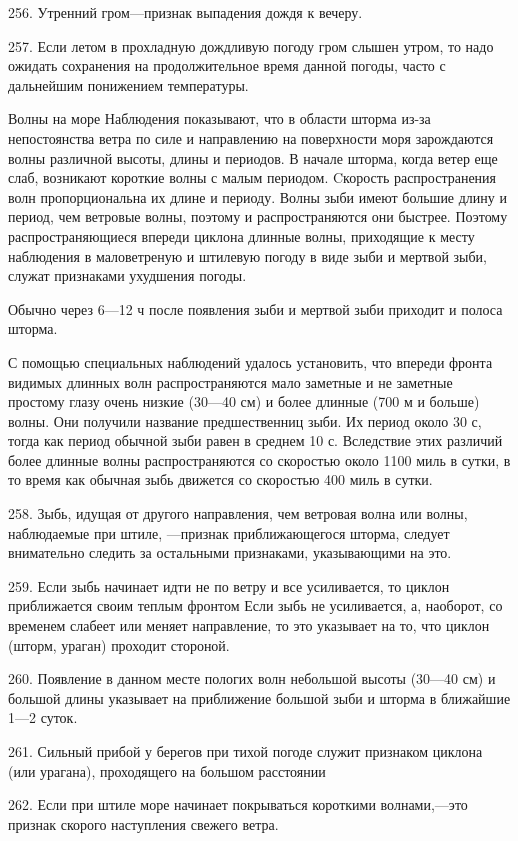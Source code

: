 256. Утренний гром—признак выпадения дождя к вечеру.

257. Если летом в прохладную дождливую погоду гром слышен утром, то надо ожидать сохранения на продолжительное время данной погоды, часто с дальнейшим понижением температуры.

Волны на море
Наблюдения показывают, что в области шторма из-за непостоянства ветра по силе и направлению на поверхности моря зарождаются волны различной высоты, длины и периодов. В начале шторма, когда ветер еще слаб, возникают короткие волны с малым периодом. Cкорость распространения волн пропорциональна их длине и периоду. Волны зыби имеют большие длину и период, чем ветровые волны, поэтому и распространяются они быстрее. Поэтому распространяющиеся впереди циклона длинные волны, приходящие к месту наблюдения в маловетреную и штилевую погоду в виде зыби и мертвой зыби, служат признаками ухудшения погоды.

Обычно через 6—12 ч после появления зыби и мертвой зыби приходит и полоса шторма.

С помощью специальных наблюдений удалось установить, что впереди фронта видимых длинных волн распространяются мало заметные и не заметные простому глазу очень низкие (30—40 см) и более длинные (700 м и больше) волны. Они получили название предшественниц зыби. Их период около 30 с, тогда как период обычной зыби равен в среднем 10 с. Вследствие этих различий более длинные волны распространяются со скоростью около 1100 миль в сутки, в то время как обычная зыбь движется со скоростью 400 миль в сутки.

258. Зыбь, идущая от другого направления, чем ветровая волна или волны, наблюдаемые при штиле, —признак приближающегося шторма, следует внимательно следить за остальными признаками, указывающими на это.

259. Если зыбь начинает идти не по ветру и все усиливается, то циклон приближается своим теплым фронтом Если зыбь не усиливается, а, наоборот, со временем слабеет или меняет направление, то это указывает на то, что циклон (шторм, ураган) проходит стороной.

260. Появление в данном месте пологих волн небольшой высоты (30—40 см) и большой длины указывает на приближение большой зыби и шторма в ближайшие 1—2 суток.

261. Сильный прибой у берегов при тихой погоде служит признаком циклона (или урагана), проходящего на большом расстоянии

262. Если при штиле море начинает покрываться короткими волнами,—это признак скорого наступления свежего ветра.

